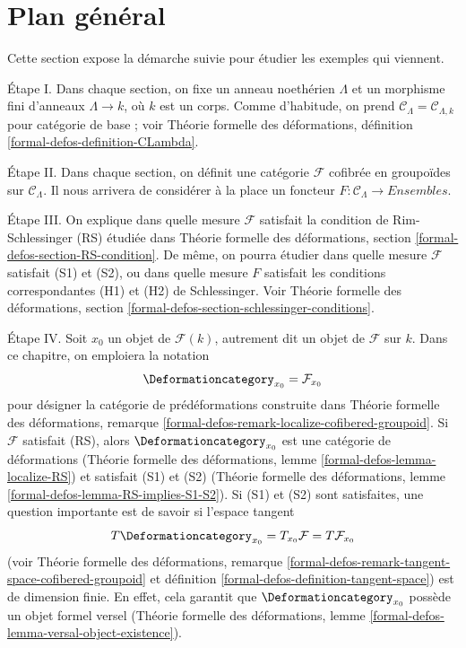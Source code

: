 \section{Plan général}
\label{section-general}

\noindent
Cette section expose la démarche suivie pour étudier les exemples qui viennent.

\medskip\noindent
Étape I. Dans chaque section, on fixe un anneau noethérien $\Lambda$ et
un morphisme fini d'anneaux $\Lambda \to k$, où $k$ est un corps.
Comme d'habitude, on prend $\mathcal{C}_\Lambda = \mathcal{C}_{\Lambda, k}$
pour catégorie de base ; voir Théorie formelle des déformations,
définition \ref{formal-defos-definition-CLambda}.

\medskip\noindent
Étape II. Dans chaque section, on définit une catégorie $\mathcal{F}$
cofibrée en groupoïdes sur $\mathcal{C}_\Lambda$. Il nous arrivera
de considérer à la place un foncteur
$F : \mathcal{C}_\Lambda \to \textit{Ensembles}$.

\medskip\noindent
Étape III. On explique dans quelle mesure $\mathcal{F}$ satisfait
la condition de Rim-Schlessinger (RS) étudiée dans Théorie formelle
des déformations, section \ref{formal-defos-section-RS-condition}.
De même, on pourra étudier dans quelle mesure $\mathcal{F}$
satisfait (S1) et (S2), ou dans quelle mesure $F$ satisfait
les conditions correspondantes (H1) et (H2) de Schlessinger.
Voir Théorie formelle des déformations, section
\ref{formal-defos-section-schlessinger-conditions}.

\medskip\noindent
Étape IV. Soit $x_0$ un objet de $\mathcal{F}(k)$, autrement dit un objet
de $\mathcal{F}$ sur $k$. Dans ce chapitre, on emploiera la notation
$$
\Deformationcategory_{x_0} = \mathcal{F}_{x_0}
$$
pour désigner la catégorie de prédéformations construite dans Théorie
formelle des déformations, remarque
\ref{formal-defos-remark-localize-cofibered-groupoid}.
Si $\mathcal{F}$ satisfait (RS), alors
$\Deformationcategory_{x_0}$ est une catégorie de déformations
(Théorie formelle des déformations, lemme
\ref{formal-defos-lemma-localize-RS})
et satisfait (S1) et (S2)
(Théorie formelle des déformations, lemme
\ref{formal-defos-lemma-RS-implies-S1-S2}).
Si (S1) et (S2) sont satisfaites, une question importante
est de savoir si l'espace tangent
$$
T\Deformationcategory_{x_0} = T_{x_0}\mathcal{F} = T\mathcal{F}_{x_0}
$$
(voir Théorie formelle des déformations, remarque
\ref{formal-defos-remark-tangent-space-cofibered-groupoid} et
définition \ref{formal-defos-definition-tangent-space})
est de dimension finie. En effet, cela garantit que
$\Deformationcategory_{x_0}$ possède un objet formel versel
(Théorie formelle des déformations, lemme
\ref{formal-defos-lemma-versal-object-existence}).

